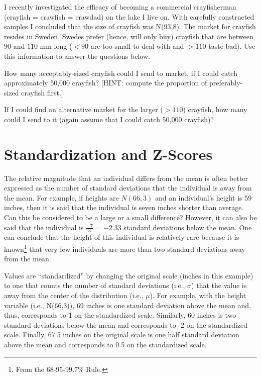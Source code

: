 \documentclass[10pt,openany]{book}\usepackage[]{graphicx}\usepackage[]{color}
\begin{document}
\begin{exsection}
  \item \label{revex:quNormCrayfish} I recently investigated the efficacy of becoming a commercial crayfisherman (crayfish = crawfish = crawdad) on the lake I live on. With carefully constructed samples I concluded that the size of crayfish was N(93,8). The market for crayfish resides in Sweden. Swedes prefer (hence, will only buy) crayfish that are between $90$ and $110$ mm long ($<90$ are too small to deal with and $>110$ taste bad).  Use this information to answer the questions below.  
\begin{Enumerate}
  \item How many acceptably-sized crayfish could I send to market, if I could catch approximately 50,000 crayfish? [HINT: compute the proportion of preferably-sized crayfish first.]
  \item If I could find an alternative market for the larger ($>110$) crayfish, how many could I send to it (again assume that I could catch 50,000 crayfish)?
\end{Enumerate}
\end{exsection}


\section{Standardization and Z-Scores}\label{sect:Standardizing}
The relative magnitude that an individual differs from the mean is often better expressed as the number of standard deviations that the individual is away from the mean.  For example, if heights are $N(66,3)$ and an individual's height is 59 inches, then it is said that the individual is seven inches shorter than average.  Can this be considered to be a large or a small difference?  However, it can also be said that the individual is $\frac{-7}{3}$ = $-2.33$ standard deviations below the mean.  One can conclude that the height of this individual is relatively rare because it is known\footnote{From the 68-95-99.7\% Rule.} that very few individuals are more than two standard deviations away from the mean.

Values are ``standardized'' by changing the original scale (inches in this example) to one that counts the number of standard deviations (i.e., $\sigma$) that the value is away from the center of the distribution (i.e., $\mu$).  For example, with the height variable (i.e., N(66,3)), 69 inches is one standard deviation above the mean and, thus, corresponds to 1 on the standardized scale.  Similarly, 60 inches is two standard deviations below the mean and corresponds to -2 on the standardized scale.  Finally, 67.5 inches on the original scale is one half standard deviation above the mean and corresponds to 0.5 on the standardized scale.
\end{document}
